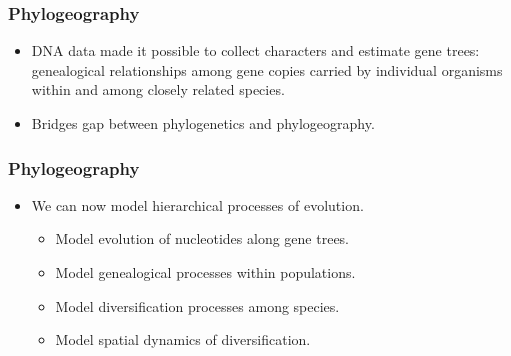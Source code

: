 \begin{frame}
    \frametitle{Phylogeography}
    \begin{itemize}
        \item DNA data made it possible to collect characters and estimate gene
            trees: genealogical relationships among gene copies carried by
            individual organisms within and among closely related species.
        \item Bridges gap between phylogenetics and phylogeography.
    \end{itemize}
\end{frame}

\begin{frame}
    \frametitle{Phylogeography}
    \begin{itemize}
        \item We can now model hierarchical processes of evolution.
        \begin{itemize}
            \item Model evolution of nucleotides along gene trees.
            \item Model genealogical processes within populations.
            \item Model diversification processes among species.
            \item Model spatial dynamics of diversification.
        \end{itemize}
    \end{itemize}
\end{frame}


